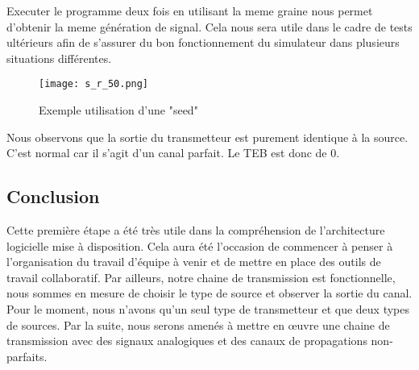 \pagebreak

Executer le programme deux fois en utilisant la meme graine nous permet d'obtenir la meme génération de signal.
Cela nous sera utile dans le cadre de tests ultérieurs afin de s'assurer du bon fonctionnement du simulateur dans plusieurs situations différentes.

\begin{figure}[H]
    \centering
    \texttt{[image: s\_r\_50.png]}
    \caption{Exemple utilisation d'une "seed"}
\end{figure}

Nous observons que la sortie du transmetteur est purement identique à la source. C'est normal car il s'agit d'un canal parfait. Le TEB est donc de 0.

\subsection{Conclusion}

Cette première étape a été très utile dans la compréhension de l'architecture logicielle mise à disposition.
Cela aura été l'occasion de commencer à penser à l'organisation du travail d'équipe à venir et de mettre en place des outils de travail collaboratif.
Par ailleurs, notre chaine de transmission est fonctionnelle, nous sommes en mesure de choisir le type de source et observer la sortie du canal.
Pour le moment, nous n'avons qu'un seul type de transmetteur et que deux types de sources. Par la suite, nous serons amenés à mettre en œuvre une chaine de transmission avec des signaux analogiques et des canaux de propagations non-parfaits.
